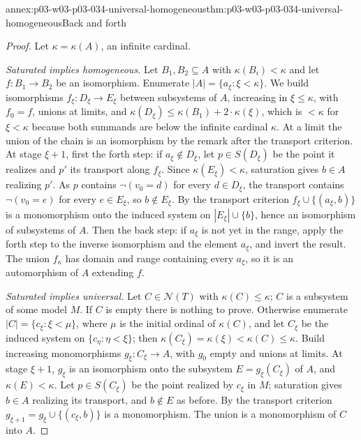 \begin{annexitem}{annex:p03-w03-p03-034-universal-homogeneous}{thm:p03-w03-p03-034-universal-homogeneous}{Back and forth}
\begin{proof}
Let \(\kappa=\kappa(A)\), an infinite cardinal.

\emph{Saturated implies homogeneous.} Let \(B_1,B_2\subseteq A\) with
\(\kappa(B_i)<\kappa\) and let \(f:B_1\to B_2\) be an isomorphism.
Enumerate \(|A|=\{a_\xi:\xi<\kappa\}\). We build isomorphisms
\(f_\xi:D_\xi\to E_\xi\) between subsystems of \(A\), increasing in
\(\xi\le\kappa\), with \(f_0=f\), unions at limits, and
\(\kappa(D_\xi)\leq\kappa(B_1)+2\cdot\kappa(\xi)\), which is \(<\kappa\)
for \(\xi<\kappa\) because both summands are below the infinite cardinal
\(\kappa\). At a limit the union of the chain is an isomorphism by the
remark after the transport criterion. At stage \(\xi+1\), first the
forth step: if \(a_\xi\notin D_\xi\), let \(p\in S(D_\xi)\) be the point
it realizes and \(p'\) its transport along \(f_\xi\). Since
\(\kappa(E_\xi)<\kappa\), saturation gives \(b\in A\) realizing \(p'\).
As \(p\) contains \(\neg(v_0=d)\) for every \(d\in D_\xi\), the transport
contains \(\neg(v_0=e)\) for every \(e\in E_\xi\), so \(b\notin E_\xi\).
By the transport criterion \(f_\xi\cup\{(a_\xi,b)\}\) is a monomorphism
onto the induced system on \(|E_\xi|\cup\{b\}\), hence an isomorphism of
subsystems of \(A\). Then the back step: if \(a_\xi\) is not yet in the
range, apply the forth step to the inverse isomorphism and the element
\(a_\xi\), and invert the result. The union \(f_\kappa\) has domain and
range containing every \(a_\xi\), so it is an automorphism of \(A\)
extending \(f\).

\emph{Saturated implies universal.} Let \(C\in\mathcal N(T)\) with
\(\kappa(C)\leq\kappa\); \(C\) is a subsystem of some model \(M\). If \(C\)
is empty there is nothing to prove. Otherwise enumerate
\(|C|=\{c_\xi:\xi<\mu\}\), where \(\mu\) is the initial ordinal of
\(\kappa(C)\), and let \(C_\xi\) be the induced system on
\(\{c_\eta:\eta<\xi\}\); then \(\kappa(C_\xi)=\kappa(\xi)<\kappa(C)\leq
\kappa\). Build increasing monomorphisms \(g_\xi:C_\xi\to A\), with
\(g_0\) empty and unions at limits. At stage \(\xi+1\), \(g_\xi\) is an
isomorphism onto the subsystem \(E=g_\xi(C_\xi)\) of \(A\), and
\(\kappa(E)<\kappa\). Let \(p\in S(C_\xi)\) be the point realized by
\(c_\xi\) in \(M\); saturation gives \(b\in A\) realizing its transport,
and \(b\notin E\) as before. By the transport criterion
\(g_{\xi+1}=g_\xi\cup\{(c_\xi,b)\}\) is a monomorphism. The union is a
monomorphism of \(C\) into \(A\).


\end{proof}
\end{annexitem}
